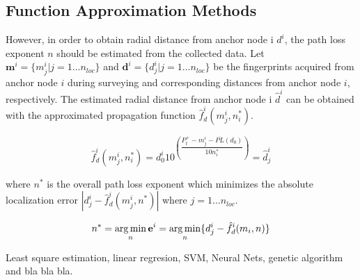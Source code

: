     \subsection{Function Approximation Methods}
        However, in order to obtain radial distance from anchor node i $d^i$, the path loss exponent $n$ should be estimated from the collected data.
        Let $\mathbf{m}^i = \{m^i_j | j=1 \ldots n_{loc} \}$ and $\mathbf{d}^i = \{ d^i_j | j = 1 \ldots n_{loc}\}$ be the fingerprints acquired from anchor node $i$ during surveying and corresponding distances from anchor node $i$, respectively.
        The estimated radial distance from anchor node i $\hat{d}^i$ can be obtained with the approximated propagation function $\hat{f}^i_d(m^i_j, n_i^*)$.

        \begin{equation}
          \label{eq:log-distance-d}
          \hat{f}^i_d(m^i_j, n_i^*) = d^i_0 10^{\left(\dfrac{P^{+}_t - m^i_j - \overline{PL}(d_0)}{10 n_i^*} \right)} = \hat{d}^i_j
        \end{equation}

        \noindent where $n^*$ is the overall path loss exponent which minimizes the absolute localization error $|d^i_j - \hat{f}^i_d(m^i_j, n^*)|$ where  $j = 1 \ldots n_{loc}$.

        \begin{equation}
          n^* = \operatorname*{arg\,min}_n \mathbf{e}^i  = \operatorname*{arg\,min}_n \{d^i_j - \hat{f}^i_d(m_i, n)\}
        \end{equation}

        Least square estimation, linear regresion, SVM, Neural Nets, genetic algorithm and bla bla bla.





